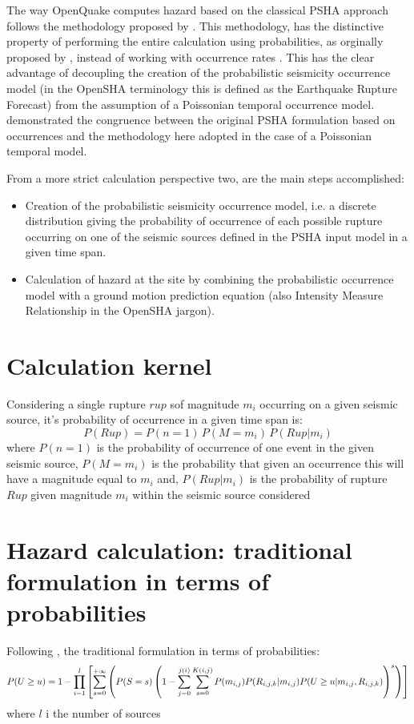 The way OpenQuake computes hazard based on the classical PSHA approach 
\citep{cornell1968,mcguire2004} follows the methodology proposed by 
\citet{field2003}. This methodology, has the distinctive property of performing
the entire calculation using probabilities, as orginally proposed by 
\citet{chiang1984}, instead of working with occurrence rates 
\citep[see for instance][]{bender1987}. This has the clear advantage of decoupling 
the creation of the probabilistic seismicity occurrence model (in the OpenSHA 
terminology this is defined as the Earthquake Rupture Forecast) from the 
assumption of a Poissonian temporal occurrence model. \citet{field2003} 
demonstrated the congruence between the original PSHA formulation based on 
occurrences and the methodology here adopted in the case of a Poissonian temporal 
model. 

From a more strict calculation perspective two, are the main steps accomplished:
\begin{itemize}
\item Creation of the probabilistic seismicity occurrence model, i.e. a discrete 
distribution giving the probability of occurrence of each possible rupture 
occurring on one of the seismic sources defined in the PSHA input model in a  
given time span.  
\item Calculation of hazard at the site by combining the probabilistic 
occurrence model with a ground motion prediction equation (also Intensity 
Measure Relationship in the OpenSHA jargon).
\end{itemize}
%
\section{Calculation kernel}
Considering a single rupture $rup$ sof magnitude $m_i$ occurring on a given seismic 
source, it's probability of occurrence in a given time span is: 
\begin{equation}
P(Rup) = P(n=1)\,P(M=m_i)\,P(Rup|m_i)
\end{equation}
where $P(n=1)$ is the probability of occurrence of one event in the given seismic
source, $P(M=m_i)$ is the probability that given an occurrence this will have a 
magnitude equal to $m_i$ and, $P(Rup|m_i)$ is the probability of rupture $Rup$
given magnitude $m_i$ within the seismic source considered 
%
\section{Hazard calculation: traditional formulation in terms of probabilities}
Following \cite{field2003}, the traditional formulation in terms of probabilities:
%
\begin{equation}
P(U\geq u)=1-\prod\limits_{i=1}^{l} 
	\left[ 
		\sum\limits_{s=0}^{+\infty}\left( 
			P(S=s) \left( 
				1-\sum\limits_{j=0}^{j(i)}
				\sum\limits_{s=0}^{K(i,j)} \\
					P(m_{i,j}) P(R_{i,j,k}|m_{i,j}) P(U\geq u|m_{i,j},R_{i,j,k}) 
			\right)^{s}
	\right)
	\right] 
\end{equation}
where $l$ i the number of sources 

